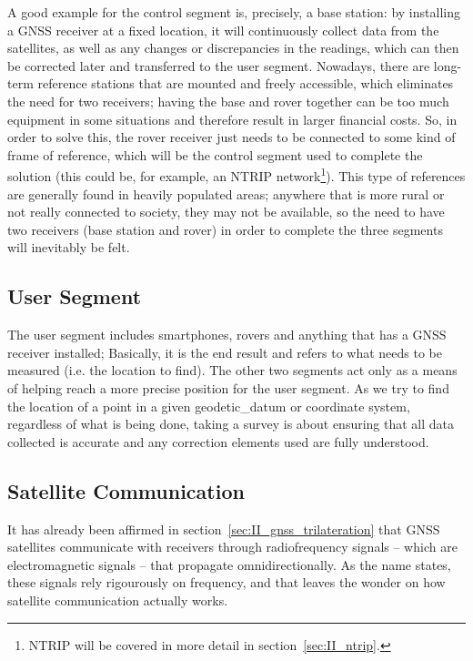 A good example for the control segment is, precisely, a base station: by installing a GNSS receiver at a fixed location, it will continuously collect data from the satellites, as well as any changes or discrepancies in the readings, which can then be corrected later and transferred to the user segment. Nowadays, there are long-term reference stations that are mounted and freely accessible, which eliminates the need for two receivers; having the base and rover together can be too much equipment in some situations and therefore result in larger financial costs.
So, in order to solve this, the rover receiver just needs to be connected to some kind of frame of reference, which will be the control segment used to complete the solution (this could be, for example, an NTRIP network\footnote{NTRIP will be covered in more detail in section~\ref{sec:II_ntrip}.}).
This type of references are generally found in heavily populated areas; anywhere that is more rural or not really connected to society, they may not be available, so the need to have two receivers (base station and rover) in order to complete the three segments will inevitably be felt.

\subsection{User Segment}\label{sec:II_gnss_user_seg}

The user segment includes smartphones, rovers and anything that has a GNSS receiver installed; Basically, it is the end result and refers to what needs to be measured (i.e. the location to find). The other two segments act only as a means of helping reach a more precise position for the user segment.
As we try to find the location of a point in a given \gls{geodetic_datum} or coordinate system, regardless of what is being done, taking a survey is about ensuring that all data collected is accurate and any correction elements used are fully understood.

\subsection{Satellite Communication}\label{sec:II_gnss_comm}

It has already been affirmed in section~\ref{sec:II_gnss_trilateration} that GNSS satellites communicate with receivers through radiofrequency signals -- which are electromagnetic signals -- that propagate omnidirectionally. As the name states, these signals rely rigourously on frequency, and that leaves the wonder on how satellite communication actually works.

